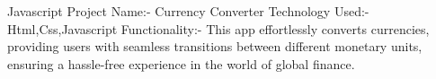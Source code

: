 Javascript Project Name:- Currency Converter
Technology Used:- Html,Css,Javascript
Functionality:- This app effortlessly converts currencies, 
providing users with seamless transitions between different monetary units,
ensuring a hassle-free experience in the world of global finance.